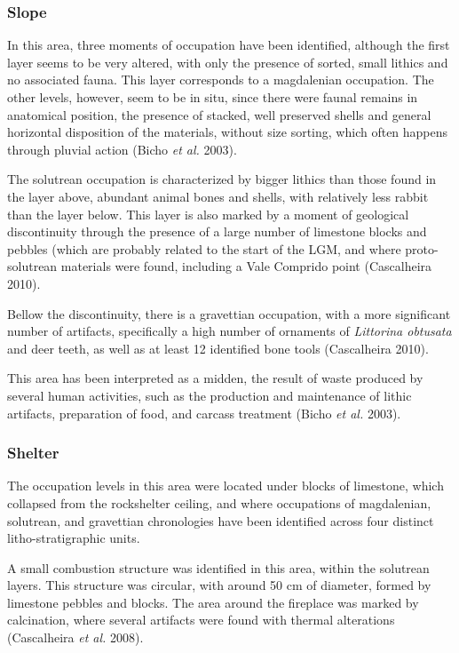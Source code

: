 \documentclass[12pt,twoside]{reedthesis}
\begin{document}
\hypertarget{slope}{%
\subsubsection{Slope}\label{slope}}

In this area, three moments of occupation have been identified, although the first layer seems to be very altered, with only the presence of sorted, small lithics and no associated fauna. This layer corresponds to a magdalenian occupation. The other levels, however, seem to be in situ, since there were faunal remains in anatomical position, the presence of stacked, well preserved shells and general horizontal disposition of the materials, without size sorting, which often happens through pluvial action (Bicho \emph{et al.} 2003).

The solutrean occupation is characterized by bigger lithics than those found in the layer above, abundant animal bones and shells, with relatively less rabbit than the layer below. This layer is also marked by a moment of geological discontinuity through the presence of a large number of limestone blocks and pebbles (which are probably related to the start of the LGM, and where proto-solutrean materials were found, including a Vale Comprido point (Cascalheira 2010).

Bellow the discontinuity, there is a gravettian occupation, with a more significant number of artifacts, specifically a high number of ornaments of \emph{Littorina obtusata} and deer teeth, as well as at least 12 identified bone tools (Cascalheira 2010).

This area has been interpreted as a midden, the result of waste produced by several human activities, such as the production and maintenance of lithic artifacts, preparation of food, and carcass treatment (Bicho \emph{et al.} 2003).

\hypertarget{shelter}{%
\subsubsection{Shelter}\label{shelter}}

The occupation levels in this area were located under blocks of limestone, which collapsed from the rockshelter ceiling, and where occupations of magdalenian, solutrean, and gravettian chronologies have been identified across four distinct litho-stratigraphic units.

A small combustion structure was identified in this area, within the solutrean layers. This structure was circular, with around 50 cm of diameter, formed by limestone pebbles and blocks. The area around the fireplace was marked by calcination, where several artifacts were found with thermal alterations (Cascalheira \emph{et al.} 2008).
\end{document}
